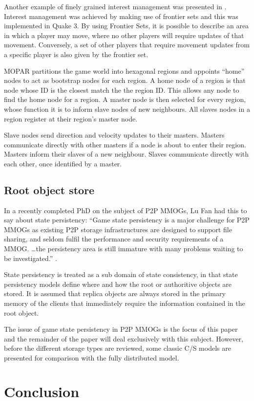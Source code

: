 Another example of finely grained interest management was presented in \cite{IM_frontier_sets}. Interest management was achieved by making use of
frontier sets and this was implemented in Quake 3. By using Frontier Sets, it is possible to describe an area in which a player may move, where no
other players will require updates of that movement. Conversely, a set of other players that require movement updates from a specific player is also
given by the frontier set.

MOPAR partitions the game world into hexagonal regions and appoints ``home'' nodes to act as bootstrap nodes for each region. A home node of a region
is that node whose ID is the closest match the the region ID. This allows any node to find the home node for a region. A master node is then selected
for every region, whose function it is to inform slave nodes of new neighbours. All slaves nodes in a region register at their region's master node.

Slave nodes send direction and velocity updates to their masters. Masters communicate directly with other masters if a node is about to enter their
region. Masters inform their slaves of a new neighbour. Slaves communicate directly with each other, once identified by a master.

\subsection{Root object store}


In a recently completed PhD on the subject of P2P MMOGs, Lu Fan had this to say about state persistency: ``Game state persistency is a major challenge for P2P MMOGs as existing P2P storage infrastructures are designed to support file sharing, and seldom fulfil the performance and security requirements of a MMOG. \ldots the persistency area is still immature with many problems waiting to be investigated.'' \cite{Fan_phd}.

State persistency is treated as a sub domain of state consistency, in that state persistency models define where and how the root or authoritive
objects are stored. It is assumed that replica objects are always stored in the primary memory of the clients that immediately require the
information contained in the root object.

The issue of game state persistency in P2P MMOGs is the focus of this paper and the remainder of the paper will deal exclusively with this subject.
However, before the different storage types are reviewed, some classic C/S models are presented for comparison with the fully distributed model.

\section{Conclusion}
